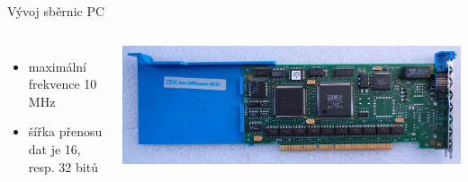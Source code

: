 \documentclass[aspectratio=43]{beamer}
\begin{document}
\begin{frame}{Vývoj sběrnic PC}
\begin{columns}
\begin{itemize}
			\item maximální frekvence 10 MHz
			\item šířka přenosu dat je 16, resp. 32 bitů
		\end{itemize}
        \vspace{0.5}
		\includegraphics[width=1\linewidth]{extrahovane_obrazky/mca.jpeg}
	\end{columns}
	
\end{frame}
\end{document}
